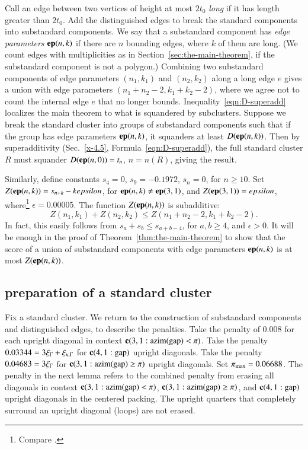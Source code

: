 Call an edge between two vertices of height at most $2t_0$ {\it long\/}
if it has length greater than $2t_0$. Add the distinguished edges to
break the standard components into substandard components. We say that a substandard component has
{\it edge parameters} ${\operatorname{\bf ep}}{(n,k)}$ if there are $n$ bounding edges, where $k$
of them are long. (We count edges with multiplicities as in
Section~\ref{sec:the-main-theorem}, if the substandard component is not a polygon.)
Combining two substandard components of edge parameters $(n_1,k_1)$ and $(n_2,k_2)$
along a long edge $e$ gives a union with edge parameters
$(n_1+n_2-2,k_1+k_2-2)$, where we agree not to count the internal edge
$e$ that no longer bounds. Inequality~\ref{eqn:D-superadd} localizes the
main theorem to what is squandered by subclusters. Suppose we break the
standard cluster into groups of substandard components such that if the group has
edge parameters ${\operatorname{\bf ep}}{(n,k)}$, it squanders at least $D({\operatorname{\bf ep}}{(n,k)})$. Then by
superadditivity (Sec.~\ref{x-4.5}, Formula~\ref{eqn:D-superadd}), the
full standard cluster $R$ must squander $D({\operatorname{\bf ep}}{(n,0)}) = t_n$, $n=n(R)$, giving
the result.

Similarly, define constants $s_4=0$, $s_9 = -0.1972$, $s_{n}=0$, for
$n\ge10$.  Set $Z({\operatorname{\bf ep}}{(n,k)}) = s_{n+k}-kepsilon$, for ${\operatorname{\bf ep}}{(n,k)}\ne {\operatorname{\bf ep}}{(3,1)}$, and
$Z({\operatorname{\bf ep}}{(3,1)})=epsilon$, where\footnote{Compare .} %
 $\epsilon=0.00005$. The function
$Z({\operatorname{\bf ep}}{(n,k)})$ is subadditive:
    $$Z(n_1,k_1)+Z(n_2,k_2) \le Z(n_1+n_2-2,k_1+k_2-2).$$
In fact, this easily follows from $s_a+s_b\le s_{a+b-4}$, for $a,b\ge
4$, and $\epsilon>0$. It will be enough in the proof of
Theorem~\ref{thm:the-main-theorem} to show that the score of a union of
substandard components with edge parameters ${\operatorname{\bf ep}}{(n,k)}$ is at most $Z({\operatorname{\bf ep}}{(n,k)})$.


\subsection{preparation of a standard cluster} %
   \label{sec:prep-cluster}

Fix a standard cluster.  We return to the construction of
substandard components and distinguished edges, to describe the penalties.
Take the penalty of $0.008$ for each  upright
diagonal in context ${\operatorname{\bf c}}{(3,1: {\operatorname{azim}}({\operatorname{gap}}) <\pi)}$. 
Take the penalty $0.03344 = 3\xi_\Gamma+\xi_{\kappa,\Gamma}$ for ${\operatorname{\bf c}}{(4,1:{\operatorname{gap}})}$
upright diagonals. Take the penalty $0.04683=3\xi_\Gamma$ for
${\operatorname{\bf c}}{(3,1: {\operatorname{azim}}({\operatorname{gap}}) \ge \pi)}$ upright diagonals. Set $\pi_{\max}=0.06688$. The penalty
in the next lemma refers to the combined penalty from erasing all
diagonals in context ${\operatorname{\bf c}}{(3,1: {\operatorname{azim}}({\operatorname{gap}}) <\pi)}$, ${\operatorname{\bf c}}{(3,1: {\operatorname{azim}}({\operatorname{gap}}) \ge \pi)}$, and ${\operatorname{\bf c}}{(4,1:{\operatorname{gap}})}$ upright diagonals in
the centered packing. The upright quarters that completely
surround an upright diagonal (loops) are not erased.

